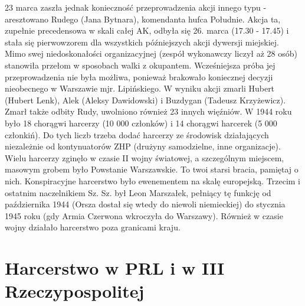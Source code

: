 23 marca zaszła jednak konieczność przeprowadzenia akcji innego typu - aresztowano Rudego (Jana Bytnara), komendanta hufca Południe. Akcja ta, zupełnie precedensowa w skali całej AK, odbyła się 26. marca (17.30 - 17.45) i stała się pierwowzorem dla wszystkich późniejszych akcji dywersji miejskiej. Mimo swej niedoskonałości organizacyjnej (zespół wykonawczy liczył aż 28 osób) stanowiła przełom w sposobach walki z okupantem. Wcześniejsza próba jej przeprowadzenia nie była możliwa, ponieważ brakowało koniecznej decyzji nieobecnego w Warszawie mjr. Lipińskiego. W wyniku akcji zmarli Hubert (Hubert Lenk), Alek (Aleksy Dawidowski) i Buzdygan (Tadeusz Krzyżewicz). Zmarł także odbity Rudy, uwolniono również 23 innych więźniów. W 1944 roku było 18 chorągwi harcerzy (10 000 członków) i 14 chorągwi harcerek (5 000 członkiń). Do tych liczb trzeba dodać harcerzy ze środowisk działających niezależnie od kontynuatorów ZHP (drużyny samodzielne, inne organizacje). Wielu harcerzy zginęło w czasie II wojny światowej, a szczególnym miejscem, masowym grobem było Powstanie Warszawskie. To twoi starsi bracia, pamiętaj o nich. Konspiracyjne harcerstwo było ewenementem na skalę europejską. Trzecim i ostatnim naczelnikiem Sz. Sz. był Leon Marszałek, pełniący tę funkcję od października 1944 (Orsza dostał się wtedy do niewoli niemieckiej) do stycznia 1945 roku (gdy Armia Czerwona wkroczyła do Warszawy). Również w czasie wojny działało harcerstwo poza granicami kraju.

\section{Harcerstwo w PRL i w III Rzeczypospolitej}

